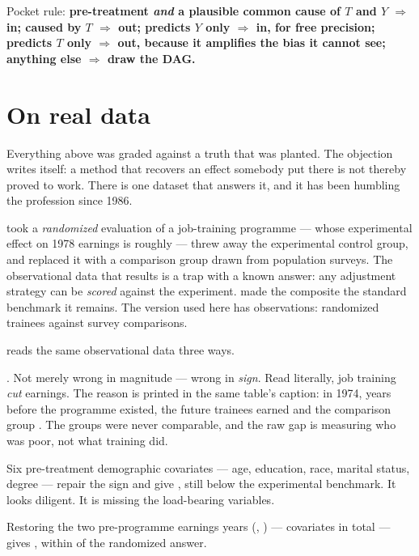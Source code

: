 \medskip\noindent
Pocket rule: \textbf{pre-treatment \emph{and} a plausible common cause of $T$ and $Y$ $\Rightarrow$
in; caused by $T$ $\Rightarrow$ out; predicts $Y$ only $\Rightarrow$ in, for free precision;
predicts $T$ only $\Rightarrow$ out, because it amplifies the bias it cannot see; anything else
$\Rightarrow$ draw the DAG.}

\section{On real data}
\label{sec:ctrl:real}

Everything above was graded against a truth that was planted. The objection writes itself: a
method that recovers an effect somebody put there is not thereby proved to work. There is one
dataset that answers it, and it has been humbling the profession since 1986.

\citet{lalonde1986} took a \emph{randomized} evaluation of a job-training programme --- whose
experimental effect on 1978 earnings is roughly \usd{\nbFiveLlBenchmark} --- threw away the
experimental control group, and replaced it with a comparison group drawn from population
surveys. The observational data that results is a trap with a known answer: any adjustment
strategy can be \emph{scored} against the experiment. \citet{dehejia1999} made the composite the
standard benchmark it remains. The version used here has \nbFiveLlN{} observations:
\nbFiveLlNTreated{} randomized trainees against \nbFiveLlNControl{} survey comparisons.

 reads the same observational data three ways.



\begin{description}[leftmargin=1.1em, style=nextline, font=\normalfont\itshape]
  \item[The naive comparison is negative.] \usd{\nbFiveLlNaive}. Not merely wrong in magnitude ---
  wrong in \emph{sign}. Read literally, job training \emph{cut} earnings. The reason is printed in
  the same table's caption: in 1974, years before the programme existed, the future trainees
  earned \usd{\nbFiveLlPreTreated} and the comparison group \usd{\nbFiveLlPreControl}. The groups
  were never comparable, and the raw gap is measuring who was poor, not what training did.
  \item[The responsible-looking adjustment lands short.] Six pre-treatment demographic
  covariates --- age, education, race, marital status, degree --- repair the sign and give
  \usd{\nbFiveLlBad}, still \usd{\nbFiveLlGapBad} below the experimental benchmark. It looks
  diligent. It is missing the load-bearing variables.
  \item[The backdoor-adjusted read lands.] Restoring the two pre-programme earnings years
  (, ) --- \nbFiveLlNGood{} covariates in total --- gives \usd{\nbFiveLlGood},
  within \usd{\nbFiveLlGapGood} of the randomized answer.
\end{description}


